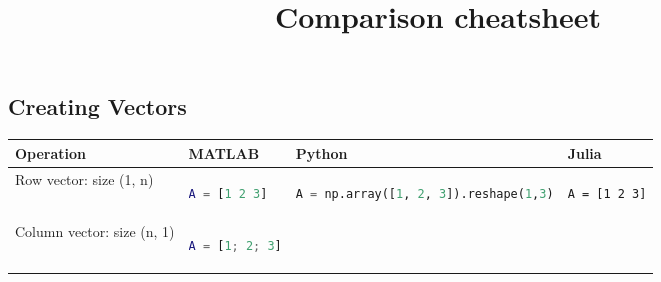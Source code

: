 \documentclass[10pt, landscape]{article}
\title{Comparison cheatsheet}
\date{}
\begin{document}
\begin{multicols}{2}

\section{Creating Vectors}\label{creating-vectors}

\begin{tabular}[]{@{}llll@{}}
\toprule
\begin{minipage}[b]{0.21\columnwidth}\raggedright
Operation
\end{minipage} & \begin{minipage}[b]{0.19\columnwidth}\raggedright
MATLAB
\end{minipage} & \begin{minipage}[b]{0.29\columnwidth}\raggedright
Python
\end{minipage} & \begin{minipage}[b]{0.19\columnwidth}\raggedright
Julia
\end{minipage}\tabularnewline
\midrule
\begin{minipage}[t]{0.21\columnwidth}\raggedright
Row vector: size (1, n)
\end{minipage} & \begin{minipage}[t]{0.19\columnwidth}\raggedright
\begin{lstlisting}[language=Matlab]
A = [1 2 3]
\end{lstlisting}

\end{minipage} & \begin{minipage}[t]{0.29\columnwidth}\raggedright
\begin{lstlisting}[language=Python]
A = np.array([1, 2, 3]).reshape(1,3)
\end{lstlisting}

\end{minipage} & \begin{minipage}[t]{0.19\columnwidth}\raggedright
\begin{lstlisting}
A = [1 2 3]
\end{lstlisting}

\end{minipage}\tabularnewline
\begin{minipage}[t]{0.21\columnwidth}\raggedright
Column vector: size (n, 1)
\end{minipage} & \begin{minipage}[t]{0.19\columnwidth}\raggedright
\begin{lstlisting}[language=Matlab]
A = [1; 2; 3]
\end{lstlisting}


\end{minipage}
\end{tabular}
\end{multicols}
\end{document}
